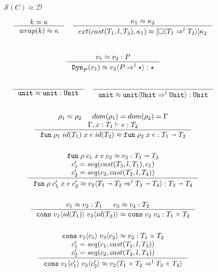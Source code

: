 \documentclass[acmsmall,review,anonymous]{acmart}\settopmatter{printfolios=true,printccs=false,printacmref=false}
\newcommand{\TOOdyn}[0]{\star}
\newcommand{\POOunit}[0]{\mathtt{Unit}}
\newcommand{\POOfun}[2]{#1 \shortrightarrow #2}
\newcommand{\POOprod}[2]{#1 \times #2}
\newcommand{\cOOcast}[3]{#1 \Rightarrow^{#2} #3}
\newcommand{\vOOcast}[2]{#1\langle#2\rangle}
\newcommand{\vOOfun}[3]{\mathtt{fun} \; #1 \; #2 \; #3}
\newcommand{\vOOtt}[0]{\mathtt{unit}}
\newcommand{\vOOcons}[2]{\mathtt{cons}\;#1\;#2}
\newcommand{\kOOcast}[2]{
  [\square \langle #1 \rangle]#2}
\newcommand{\hcvOOinj}[2]{\mathtt{Dyn}_{#1}(#2)}
\newcommand{\hcvOOfun}[5]{\mathtt{fun} \; #2 \; #1 \; #3 \; #4 \; #5}
\newcommand{\hcvOOtt}[0]{\mathtt{unit}}
\newcommand{\hcvOOcons}[4]{\mathtt{cons}\;#1\langle#2\rangle\;#3\langle#4\rangle}
\newcommand{\ineffCEKD}{$\mathcal{D}$}
\newcommand{\effCEK}[1]{$\mathcal{S}(#1)$}
\begin{document}
\begin{figure}
  $\text{\effCEK{C}} \approx \text{\ineffCEKD}$
  
  \fbox{$\kappa \approx \kappa$}
  \begin{gather*}
  \inference{
    k \approx \kappa
  }{
    wrap(k) \approx \kappa
  }
  \quad
  \inference{
    \kappa_1 \approx \kappa_2
  }{
    ext(cast(T_1,l,T_2),\kappa_1) \approx 
    \kOOcast{\cOOcast{T_1}{l}{T_2}}{\kappa_2}
  }
\\
  \end{gather*}
\\  
  \begin{gather*}
  \inference{
    v_1 \approx v_2 : P
  }{
    \hcvOOinj{P}{v_1} \approx \vOOcast{v_2}{\cOOcast{P}{l}{\TOOdyn}}
    : \TOOdyn
  }
\\ \\
   \inference{}{
    \hcvOOtt \approx \vOOtt : \POOunit
   }
   \quad
  \inference{}{
    \hcvOOtt \approx \vOOcast{\vOOtt}{\cOOcast{\POOunit}{l}{\POOunit}}
    : \POOunit
  }
  \\ \\
  \inference{
    \rho_1 \approx \rho_2 &
    dom(\rho_1) = dom(\rho_2) = \Gamma \\
    \Gamma , x : T_1 \vdash e : T_2
  }{
    \hcvOOfun{id(T_1)}{\rho_1}{x}{e}{id(T_2)}
    \approx
    \vOOfun{\rho_2}{x}{e}
    : \POOfun{T_1}{T_2}
  }
\\ \\
\inference{
\hcvOOfun{c_1}{\rho}{x}{e}{c_2} \approx v_2 : \POOfun{T_1}{T_2} \\
c_1' = seq(cast(T_3,l,T_1),c_1) \\
c_2' = seq(c_2,cast(T_2,l,T_4))
}{
\hcvOOfun{c_1'}{\rho}{x}{e}{c_2'}
\approx
\vOOcast{v_2}{\cOOcast{\POOfun{T_1}{T_2}}{l}{\POOfun{T_3}{T_4}}}
: \POOfun{T_3}{T_4}
}
\\ \\
  \inference{
    v_1 \approx v_2 : T_1 &
    v_3 \approx v_4 : T_2 &
  }{
    \hcvOOcons{v_1}{id(T_1)}{v_3}{id(T_2)}
    \approx
    \vOOcons{v_2}{v_4}
    : \POOprod{T_1}{T_2}
  }
\\ \\
  \inference{
    \hcvOOcons{v_1}{c_1}{v_3}{c_2} \approx v_2 : \POOprod{T_1}{T_2} \\
    c_1' = seq(c_1,cast(T_1,l,T_3)) \\
    c_2' = seq(c_2,cast(T_2,l,T_4))
  }{
    \hcvOOcons{v_1}{c_1'}{v_3}{c_2'} \approx
    \vOOcast{v_2}{\cOOcast{\POOprod{T_1}{T_2}}{l}{\POOprod{T_3}{T_4}}}
}
\end{gather*}
\end{figure}
\end{document}
